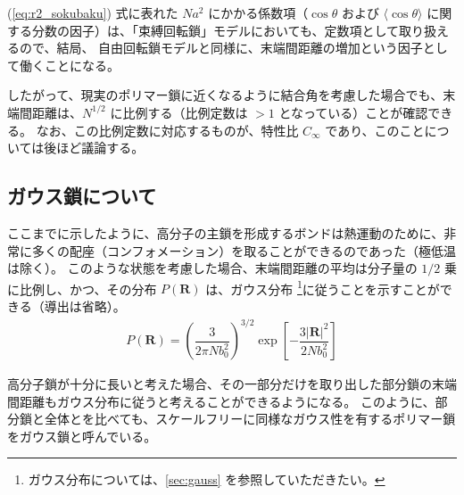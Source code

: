 \documentclass[uplatex,dvipdfmx,a4paper,11pt, titlepage]{jsarticle}
\begin{document}
(\ref{eq:r2_sokubaku}) 式に表れた $Na^2$ にかかる係数項（$\cos \theta$ および $\langle \cos \theta \rangle$ に関する分数の因子）は、「束縛回転鎖」モデルにおいても、定数項として取り扱えるので、結局、
自由回転鎖モデルと同様に、末端間距離の増加という因子として働くことになる。

したがって、現実のポリマー鎖に近くなるように結合角を考慮した場合でも、末端間距離は、$N^{1/2}$ に比例する（比例定数は $> 1$ となっている）ことが確認できる。
なお、この比例定数に対応するものが、特性比 $C_{\infty}$ であり、このことについては後ほど議論する。

\subsection{ガウス鎖について}

ここまでに示したように、高分子の主鎖を形成するボンドは熱運動のために、非常に多くの配座（コンフォメーション）を取ることができるのであった（極低温は除く）。
このような状態を考慮した場合、末端間距離の平均は分子量の $1/2$ 乗に比例し、かつ、その分布 $P(\bm{R})$ は、ガウス分布
\footnote
{
ガウス分布については、\ref{sec:gauss} を参照していただきたい。
}に従うことを示すことができる（導出は省略）。
\begin{align}
P(\bm{R}) =\left( \dfrac{3}{2 \pi N b_0^2} \right)^{3/2} \exp \left[ -\dfrac{3|\bm{R}|^2}{2Nb_0^2} \right]
\end{align}

高分子鎖が十分に長いと考えた場合、その一部分だけを取り出した部分鎖の末端間距離もガウス分布に従うと考えることができるようになる。
このように、部分鎖と全体とを比べても、スケールフリーに同様なガウス性を有するポリマー鎖をガウス鎖と呼んでいる。
\end{document}
